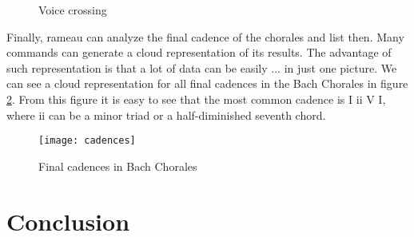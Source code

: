 \begin{figure}[!h]
  \centering
  \caption{Voice crossing}
  \label{fig:coral-003}
\end{figure}

Finally, rameau can analyze the final cadence of the chorales and list
then. Many commands can generate a cloud representation of its
results. The advantage of such representation is that a lot of data
can be easily ... in just one picture. We can see a cloud
representation for all final cadences in the Bach Chorales in figure
\ref{fig:cadences}. From this figure it is easy to see that the most
common cadence is I ii V I, where ii can be a minor triad or a
half-diminished seventh chord.

\begin{figure}
  \centering
  \texttt{[image: cadences]}
  \caption{Final cadences in Bach Chorales}
  \label{fig:cadences}
\end{figure}

  

\section{Conclusion}
\label{sec:conclusion}


